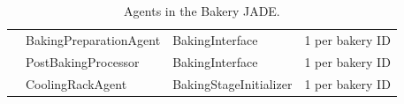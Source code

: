 \documentclass{beamer}
\begin{document}
\begin{frame}
\begin{table}[h!]
\begin{tabular}{llll}
					{} & BakingPreparationAgent & BakingInterface & 1 per bakery ID \\
					
					\cmidrule(l){2-4} 
					
					{} & PostBakingProcessor & BakingInterface &  1 per bakery ID \\
					
					\cmidrule(l){2-4} 
					
					{} & CoolingRackAgent & BakingStageInitializer &  1 per bakery ID \\
					
					\bottomrule
				\end{tabular}
				\caption{Agents in the Bakery JADE.} 
				\label{table-agents}
			\end{table}
			
		\end{frame}
		
\end{document}
